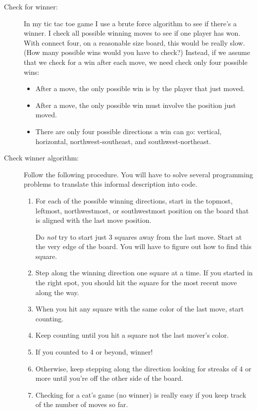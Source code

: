 \documentclass[12pt]{article}
\begin{document}
\begin{description}
\item[Check for winner:] In my tic tac toe game I use a brute force
algorithm to see if there's a winner.  I check all possible winning
moves to see if one player has won.  With connect four, on a reasonable
size board, this would be really slow.  (How many possible wins would
you have to check?)  Instead, if we assume that we check for a win
after each move, we need check only four possible wins:
\begin{itemize}
\item After a move, the only possible win is by the player that
just moved.
\item After a move, the only possible win must involve the
position just moved.
\item There are only four possible directions a win can go: 
vertical, horizontal, northwest-southeast, and southwest-northeast.
\end{itemize}

\item[Check winner algorithm:] Follow the following procedure.
You will have to solve several programming problems to translate
this informal description into code.

\begin{enumerate}
\item For each of the possible winning
directions, start in the topmost, leftmost, northwestmost, or southwestmost
position on the board that is aligned with the last move position.  

Do {\em not} try to start just 3 squares away from the last move.
Start at the very edge of the board.  You will have to figure
out how to find this square.

\item Step along the winning direction one square at a time.
If you started in the right spot, you should hit the square
for the most recent move along the way.
\item When you hit any square with the same color of the last move,
start counting.
\item Keep counting until you hit a square not the last mover's color.
\item If you counted to 4 or beyond, winner!
\item Otherwise, keep stepping along the direction looking for
streaks of 4 or more until you're off the other side of the 
board.
\item Checking for a cat's game (no winner) is really easy
if you keep track of the number of moves so far.
\end{enumerate}


\end{description}
\end{document}
